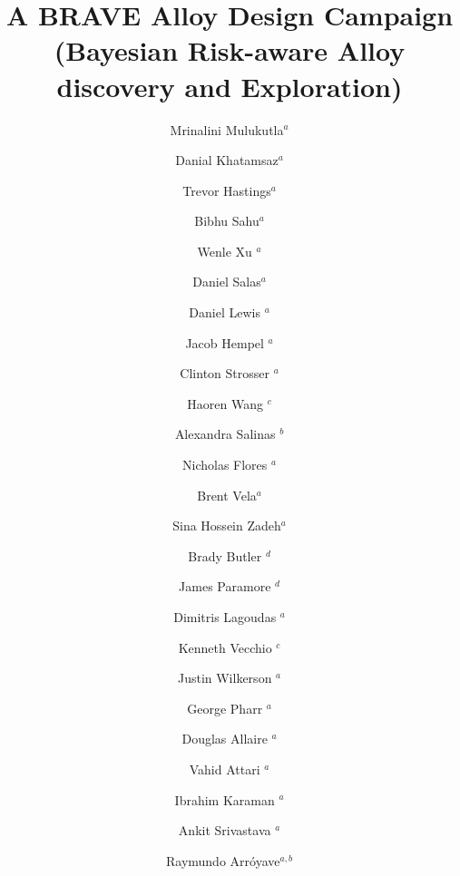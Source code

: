 \documentclass[letterpaper,4pt,times,preprint]{elsarticle}
\begin{document}
\begin{frontmatter}
\title{\Large{A BRAVE Alloy Design Campaign\\
(Bayesian Risk-aware Alloy discovery and Exploration)}}




\author{Mrinalini Mulukutla$^{a}$}
\author{Danial Khatamsaz$^{a}$}
\author{Trevor Hastings$^{a}$}
\author{Bibhu Sahu$^{a}$}
\author{Wenle Xu $^{a}$}
\author{Daniel Salas$^{a}$}
\author{Daniel Lewis $^{a}$}
\author{Jacob Hempel $^{a}$}
\author{Clinton Strosser $^{a}$}
\author{Haoren Wang $^{c}$}
\author{Alexandra Salinas $^{b}$}
\author{Nicholas Flores $^{a}$}
\author{Brent Vela$^{a}$}
\author{Sina Hossein Zadeh$^{a}$}
\author{Brady Butler $^{d}$}
\author{James Paramore $^{d}$}
\author{Dimitris Lagoudas $^{a}$}
\author{Kenneth Vecchio $^{c}$}
\author{Justin Wilkerson $^{a}$}
\author{George Pharr $^{a}$}
\author{Douglas Allaire $^{a}$}
\author{Vahid Attari $^{a}$}
\author{Ibrahim Karaman $^{a}$}
\author{Ankit Srivastava $^{a}$}
\author{Raymundo Arr\'{o}yave$^{a,b}$}


\address{$^a$Department of Materials Science and Engineering, Texas A\&M University, College Station, TX 77843, USA}
\address{$^b$Mechanical Engineering Department, Texas A\&M University, College Station, TX, USA 77840}
\address{$^c$University of California- San Diego, San Diego, CA 92093}
\address{$^d$DEVCOM Army Research Laboratory South at Texas A\&M University, College Station, TX 77843-3003, USA}



\end{frontmatter}
\end{document}
